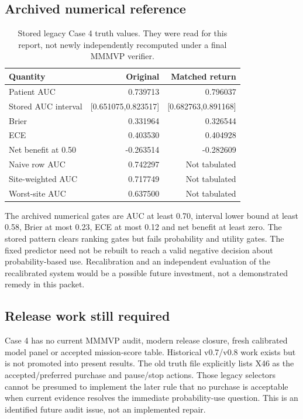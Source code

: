 \documentclass[11pt,a4paper]{article}
\begin{document}
\subsection{Archived numerical reference}

\begin{table}[H]\small
\caption{Stored legacy Case 4 truth values. They were read for this report, not newly independently recomputed under a final MMMVP verifier.}
\begin{tabularx}{\textwidth}{@{}Yrr@{}}\toprule
Quantity & Original & Matched return \\\midrule
Patient AUC & 0.739713 & 0.796037 \\
Stored AUC interval & [0.651075,0.823517] & [0.682763,0.891168] \\
Brier & 0.331964 & 0.326544 \\
ECE & 0.403530 & 0.404928 \\
Net benefit at 0.50 & -0.263514 & -0.282609 \\
Naive row AUC & 0.742297 & Not tabulated \\
Site-weighted AUC & 0.717749 & Not tabulated \\
Worst-site AUC & 0.637500 & Not tabulated \\\bottomrule
\end{tabularx}
\end{table}

The archived numerical gates are AUC at least 0.70, interval lower bound at least 0.58, Brier at most 0.23, ECE at most 0.12 and net benefit at least zero. The stored pattern clears ranking gates but fails probability and utility gates. The fixed predictor need not be rebuilt to reach a valid negative decision about probability-based use. Recalibration and an independent evaluation of the recalibrated system would be a possible future investment, not a demonstrated remedy in this packet.

\subsection{Release work still required}

Case 4 has no current MMMVP audit, modern release closure, fresh calibrated model panel or accepted mission-score table. Historical v0.7/v0.8 work exists but is not promoted into present results. The old truth file explicitly lists X46 as the accepted/preferred purchase and pause/stop actions. Those legacy selectors cannot be presumed to implement the later rule that no purchase is acceptable when current evidence resolves the immediate probability-use question. This is an identified future audit issue, not an implemented repair.
\end{document}
